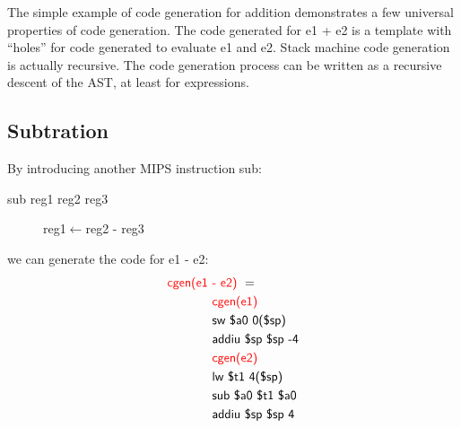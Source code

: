 The simple example of code generation for addition demonstrates a few universal properties of code generation. The code generated for \textsf{e1 + e2} is a template with ``holes'' for code generated to evaluate e1 and e2. Stack machine code generation is actually recursive. The code generation process can be written as a recursive descent of the AST, at least for expressions.

\subsection{Subtration}
By introducing another MIPS instruction sub:
\begin{description}
\item[sub reg1 reg2 reg3] reg1$\leftarrow$reg2 - reg3
\end{description}
we can generate the code for \textsf{e1 - e2}:
\begin{equation*}\begin{split}
\textsf{\color{red}cgen(e1 }&\textsf{\color{red}- e2) }=\\
&\textsf{\color{red}cgen(e1)}\\
&\textsf{sw \$a0 0(\$sp)}\\
&\textsf{addiu \$sp \$sp -4}\\
&\textsf{\color{red}cgen(e2)}\\
&\textsf{lw \$t1 4(\$sp)}\\
&\textsf{sub \$a0 \$t1 \$a0}\\
&\textsf{addiu \$sp \$sp 4}
\end{split}\end{equation*}

